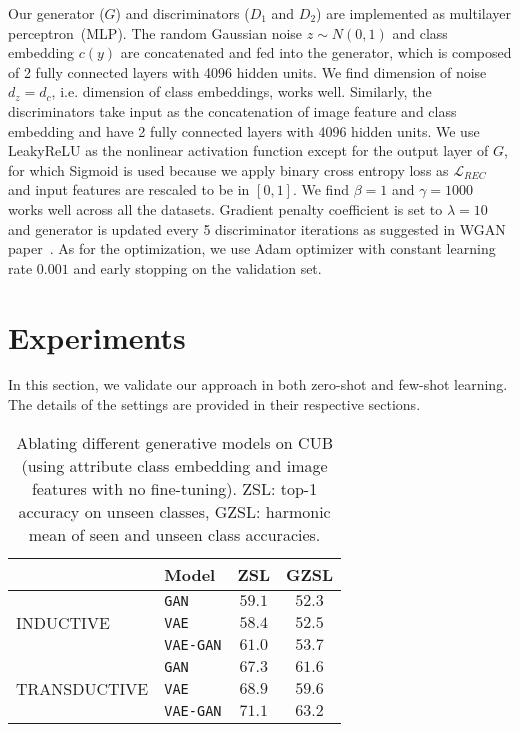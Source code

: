 \documentclass[10pt,twocolumn,letterpaper]{article}
\newcommand{\myparagraph}[1]{\vspace{5pt}\noindent{\bf #1}}
\begin{document}
\myparagraph{Implementation Details.}
Our generator ($G$) and discriminators ($D_1$ and $D_2$) are implemented as multilayer perceptron~(MLP). The random Gaussian noise $z\sim N(0, 1)$ and class embedding $c(y)$ are concatenated and fed into the generator, which is composed of 2 fully connected layers with 4096 hidden units. We find dimension of noise $d_z=d_c$, i.e. dimension of class embeddings, works well. Similarly, the discriminators take input as the concatenation of image feature and class embedding and have 2 fully connected layers with 4096 hidden units. We use LeakyReLU as the nonlinear activation function except for the output layer of $G$, for which Sigmoid is used because we apply binary cross entropy loss as $\mathcal{L}_{REC}$ and input features are rescaled to be in $[0,1]$. We find $\beta=1$ and $\gamma=1000$ works well across all the datasets. Gradient penalty coefficient is set to $\lambda=10$ and generator is updated every 5 discriminator iterations as suggested in WGAN paper~\cite{arjovsky2017wasserstein}. As for the optimization, we use Adam optimizer with constant learning rate $0.001$ and early stopping on the validation set.


\section{Experiments}
In this section, we validate our approach in both zero-shot and few-shot learning. The details of the settings are provided in their respective sections.

{
\setlength{\tabcolsep}{6pt}
\renewcommand{\arraystretch}{1.2} 
\begin{table}[t]
 \centering
   \begin{tabular}{l l c c}
    & \textbf{Model} & \textbf{ZSL} & \textbf{GZSL} \\ \hline
    \multirow{3}{*}{INDUCTIVE} & \texttt{GAN} & $59.1$ & $52.3$ \\
    & \texttt{VAE} & $58.4$ & $52.5$ \\
    & \texttt{VAE-GAN} & $61.0$ & $53.7$ \\
    \hline
    \multirow{3}{*}{TRANSDUCTIVE} & \texttt{GAN} & $67.3$ & $61.6$ \\
    & \texttt{VAE} & $68.9$ & $59.6$ \\
    & \texttt{VAE-GAN} & $\mathbf{71.1}$ & $\mathbf{63.2}$
     \end{tabular}
\caption{Ablating different generative models on CUB (using attribute class embedding and image features with no fine-tuning). ZSL: top-1 accuracy on unseen classes, GZSL: harmonic mean of seen and unseen class accuracies. }
\label{tab:ablation}
\end{table}
}
\end{document}
